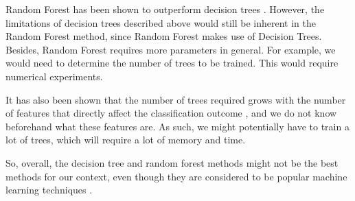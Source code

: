 \documentclass[12pt, twoside, a4paper]{report}
\begin{document}
Random Forest has been shown to outperform decision trees \cite{RefWorks:103}. However, the limitations of decision trees described above would still be inherent in the Random Forest method, since Random Forest makes use of Decision Trees. Besides, Random Forest requires more parameters in general. For example, we would need to determine the number of trees to be trained. This would require numerical experiments.

It has also been shown that the number of trees required grows with the number of features that directly affect the classification outcome \cite{RefWorks:102}, and we do not know beforehand what these features are. As such, we might potentially have to train a lot of trees, which will require a lot of memory and time.

So, overall, the decision tree and random forest methods might not be the best methods for our context, even though they are considered to be popular machine learning techniques \cite{RefWorks:103}.
\end{document}
